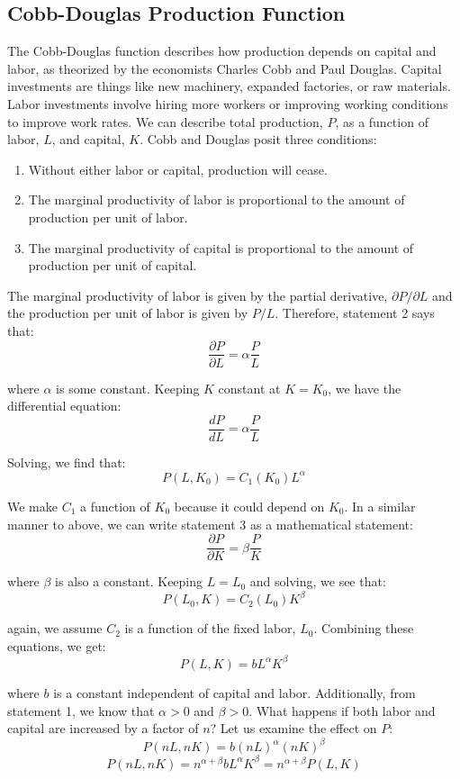 \subsection{Cobb-Douglas Production Function}
The Cobb-Douglas function describes how production depends on capital and labor, 
as theorized by the economists Charles Cobb and Paul Douglas. Capital 
investments are things like new machinery, expanded factories, or raw 
materials. Labor investments involve hiring more workers or improving 
working conditions to improve work rates. We can describe total production, 
$P$, as a function of labor, $L$, and capital, $K$. Cobb and Douglas posit 
three conditions:
\begin{enumerate}
\item Without either labor or capital, production will cease.
\item The marginal productivity of labor is proportional to the amount of production 
per unit of labor.
\item The marginal productivity of capital is proportional to the amount of 
production per unit of capital.
\end{enumerate}

The marginal productivity of labor is given by the partial derivative, $\partial P 
/ \partial L$ and the production per unit of labor is given by $P / L$. 
Therefore, statement 2 says that:
$$\frac{\partial P}{\partial L} = \alpha \frac{P}{L}$$

where $\alpha$ is some constant. Keeping $K$ constant at $K = K_0$, we have 
the differential equation:
$$ \frac{d P}{d L} = \alpha \frac{P}{L}$$

Solving, we find that:
$$P(L, K_0) = C_1 \left( K_0 \right) L^{\alpha}$$

We make $C_1$ a function of $K_0$ because it could depend on $K_0$. In a 
similar manner to above, we can write statement 3 as a mathematical statement:
$$\frac{\partial P}{\partial K} = \beta \frac{P}{K}$$

where $\beta$ is also a constant. Keeping $L = L_0$ and solving, we see that:
$$P(L_0, K) = C_2(L_0)K^{\beta}$$

again, we assume $C_2$ is a function of the fixed labor, $L_0$. Combining 
these equations, we get:
$$P(L, K) = bL^{\alpha} K^{\beta}$$

where $b$ is a constant independent of capital and labor. Additionally, from 
statement 1, we know that $\alpha > 0$ and $\beta > 0$. What happens if both 
labor and capital are increased by a factor of $n$? Let us examine the effect 
on $P$:
$$P(nL, nK) = b \left( nL \right)^{\alpha} \left( nK \right)^{\beta}$$
$$P(nL, nK) = n^{\alpha + \beta} b L^{\alpha} K^{\beta} = n^{\alpha + \beta} 
P(L, K)$$

